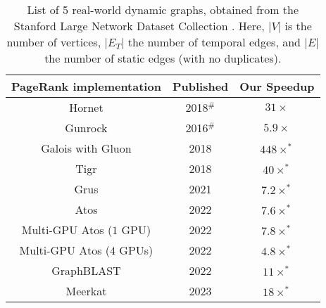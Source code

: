 \begin{table}[hbtp]
  \centering
  \caption{List of 5 real-world dynamic graphs, obtained from the Stanford Large Network Dataset Collection \cite{snapnets}. Here, $|V|$ is the number of vertices, $|E_T|$ the number of temporal edges, and $|E|$ the number of static edges (with no duplicates).}
  \label{tab:compare-large}
  \begin{tabular}{|c|c||c|}
    \toprule
    \textbf{PageRank implementation} &
    \textbf{Published} &
    \textbf{Our Speedup} \\
    \midrule
    Hornet \cite{busato2018hornet} & 2018$^\#$ & $31\times$ \\ \hline
    Gunrock \cite{wang2016gunrock} & 2016$^\#$ & $5.9\times$ \\ \hline
    Galois with Gluon \cite{dathathri2018gluon} & 2018 & $448\times^*$ \\ \hline
    Tigr \cite{nodehi2018tigr} & 2018 & $40\times^*$ \\ \hline
    Grus \cite{wang2021grus} & 2021 & $7.2\times^*$ \\ \hline
    Atos \cite{chen2022atos} & 2022 & $7.6\times^*$ \\ \hline
    Multi-GPU Atos ($1$ GPU) \cite{chen2022scalable} & 2022 & $7.8\times^*$ \\ \hline
    Multi-GPU Atos ($4$ GPUs) \cite{chen2022scalable} & 2022 & $4.8\times^*$ \\ \hline
    GraphBLAST \cite{yang2022graphblast} & 2022 & $11\times^*$ \\ \hline
    Meerkat \cite{concessao2023meerkat} & 2023 & $18\times^*$ \\ \hline
  \bottomrule
  \end{tabular}
\end{table}
